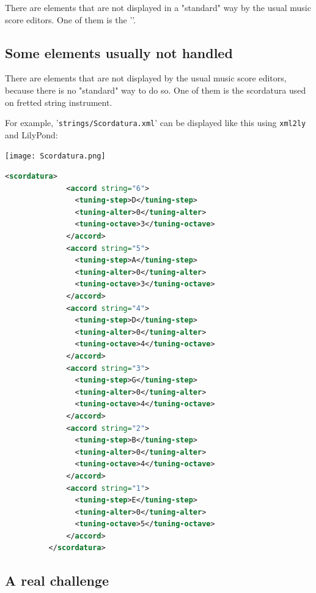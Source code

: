 \documentclass[12pt,a4paper]{article}
\begin{document}
There are elements that are not displayed in a "standard" way by the usual music score editors. One of them is the {'\tt <beat-repeat>}'.


\subsection{Some elements usually not handled}

There are elements that are not displayed by the usual music score editors, because there is no "standard" way to do so. One of them is the scordatura used on fretted string instrument.

For example, {'\tt strings/Scordatura.xml}' can be displayed like this using {\tt xml2ly} and LilyPond:

\texttt{[image: Scordatura.png]}

\begin{lstlisting}[language=XML, caption =Scordatura example]
          <scordatura>
              <accord string="6">
                <tuning-step>D</tuning-step>
                <tuning-alter>0</tuning-alter>
                <tuning-octave>3</tuning-octave>
              </accord>
              <accord string="5">
                <tuning-step>A</tuning-step>
                <tuning-alter>0</tuning-alter>
                <tuning-octave>3</tuning-octave>
              </accord>
              <accord string="4">
                <tuning-step>D</tuning-step>
                <tuning-alter>0</tuning-alter>
                <tuning-octave>4</tuning-octave>
              </accord>
              <accord string="3">
                <tuning-step>G</tuning-step>
                <tuning-alter>0</tuning-alter>
                <tuning-octave>4</tuning-octave>
              </accord>
              <accord string="2">
                <tuning-step>B</tuning-step>
                <tuning-alter>0</tuning-alter>
                <tuning-octave>4</tuning-octave>
              </accord>
              <accord string="1">
                <tuning-step>E</tuning-step>
                <tuning-alter>0</tuning-alter>
                <tuning-octave>5</tuning-octave>
              </accord>
          </scordatura>

\end{lstlisting}


\subsection{A real challenge}
\end{document}
